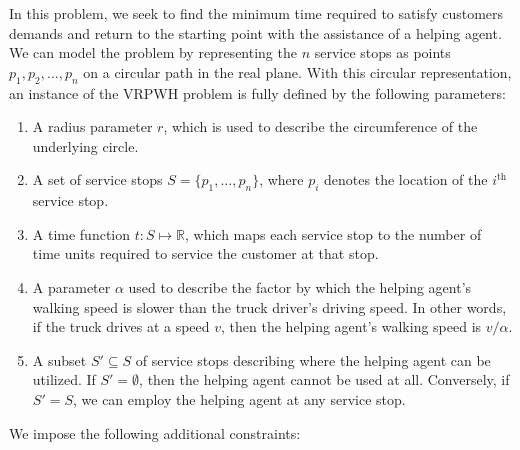 \documentclass[12pt]{scrartcl}
\begin{document}
In this problem, we seek to find the minimum time required to satisfy customers demands and return to the starting point with the assistance of a helping agent. \\

\noindent We can model the problem by representing the $n$ service stops as points $p_1, p_2, \ldots, p_n$ on a circular path in the real plane. With this circular representation, an instance of the VRPWH problem is fully defined by the following parameters:

\begin{enumerate}
    \item A radius parameter $r$, which is used to describe the circumference of the underlying circle.
    \item A set of service stops $S = \{p_1, \ldots, p_n\}$, where $p_i$ denotes the location of the $i^{\text{th}}$ service stop.
    \item A time function $t : S \mapsto \mathbb{R}$, which maps each service stop to the number of time units required to service the customer at that stop.
    \item A parameter $\alpha$ used to describe the factor by which the helping agent's walking speed is slower than the truck driver's driving speed. In other words, if the truck drives at a speed $v$, then the helping agent's walking speed is $v/\alpha$.
    \item A subset $S' \subseteq S$ of service stops describing where the helping agent can be utilized. If $S' = \emptyset$, then the helping agent cannot be used at all. Conversely, if $S' = S$, we can employ the helping agent at any service stop. 
\end{enumerate}


We impose the following additional constraints: 
\end{document}
